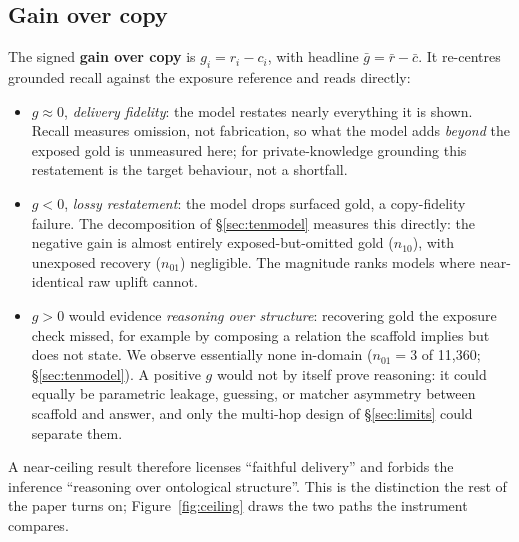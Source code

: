 \documentclass[10pt,twocolumn]{article}
\begin{document}
\subsection{Gain over copy}
The signed \textbf{gain over copy} is $g_i=r_i-c_i$, with headline $\bar g=\bar r-\bar c$. It
re-centres grounded recall against the exposure reference and reads directly:
\begin{itemize}[topsep=2pt,itemsep=1pt,leftmargin=1.4em]
\item $g\approx0$, \emph{delivery fidelity}: the model restates nearly everything it is shown. Recall
measures omission, not fabrication, so what the model adds \emph{beyond} the exposed gold is unmeasured
here; for private-knowledge grounding this restatement is the target behaviour, not a shortfall.
\item $g<0$, \emph{lossy restatement}: the model drops surfaced gold, a copy-fidelity failure. The
decomposition of \S\ref{sec:tenmodel} measures this directly: the negative gain is almost entirely
exposed-but-omitted gold ($n_{10}$), with unexposed recovery ($n_{01}$) negligible. The magnitude
ranks models where near-identical raw uplift cannot.
\item $g>0$ would evidence \emph{reasoning over structure}: recovering gold the exposure check missed,
for example by composing a relation the scaffold implies but does not state. We observe essentially
none in-domain ($n_{01}=3$ of 11{,}360; \S\ref{sec:tenmodel}). A positive $g$ would not by itself prove
reasoning: it could equally be parametric leakage, guessing, or matcher asymmetry between scaffold and
answer, and only the multi-hop design of \S\ref{sec:limits} could separate them.
\end{itemize}
A near-ceiling result therefore licenses ``faithful delivery'' and forbids the inference ``reasoning
over ontological structure''. This is the distinction the rest of the paper turns on;
Figure~\ref{fig:ceiling} draws the two paths the instrument compares.


\end{document}
